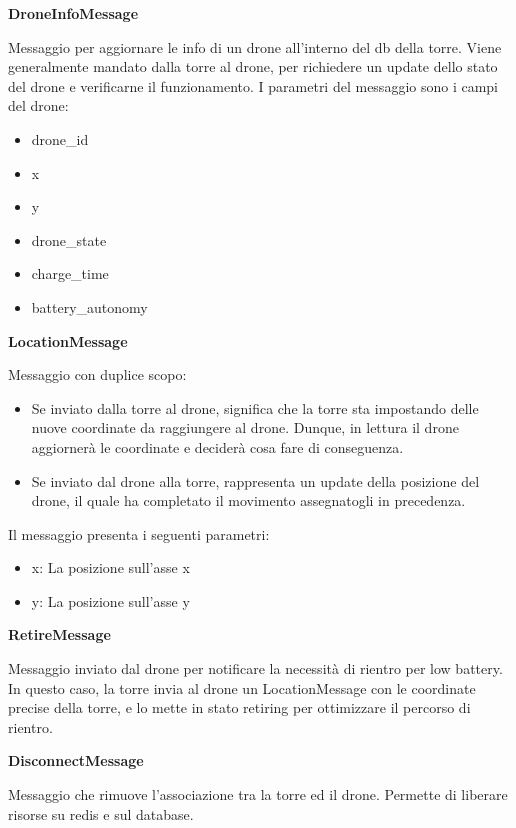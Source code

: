 \documentclass[a4paper, 11pt]{article}
\newenvironment{myindentpar}[1]%
  {\begin{list}{}%
          {\setlength{\leftmargin}{#1}}%
          \item[]%
  }
  {\end{list}}
\begin{document}
\textbf{DroneInfoMessage}
\begin{myindentpar}{0.4cm}
Messaggio per aggiornare le info di un drone all'interno del db della torre. Viene generalmente mandato dalla torre al drone, per richiedere un update dello stato del drone e verificarne il funzionamento.
I parametri del messaggio sono i campi del drone:
\begin{itemize}
    \item drone\_id
    \item x
    \item y
    \item drone\_state
    \item charge\_time
    \item battery\_autonomy
\end{itemize}
\end{myindentpar}

\textbf{LocationMessage}
\begin{myindentpar}{0.4cm}
Messaggio con duplice scopo:
\begin{itemize}
    \item Se inviato dalla torre al drone, significa che la torre sta impostando delle nuove coordinate da raggiungere al drone. Dunque, in lettura il drone aggiornerà le coordinate e deciderà cosa fare di conseguenza.
    \item Se inviato dal drone alla torre, rappresenta un update della posizione del drone, il quale ha completato il movimento assegnatogli in precedenza.
\end{itemize}
Il messaggio presenta i seguenti parametri:
\begin{itemize}
    \item x: La posizione sull'asse x
    \item y: La posizione sull'asse y
\end{itemize}
\end{myindentpar}

\textbf{RetireMessage}
\begin{myindentpar}{0.4cm}
Messaggio inviato dal drone per notificare la necessità di rientro per low battery.
In questo caso, la torre invia al drone un LocationMessage con le coordinate precise della torre, e lo mette in stato retiring per ottimizzare il percorso di rientro.
\end{myindentpar}

\textbf{DisconnectMessage}
\begin{myindentpar}{0.4cm}
Messaggio che rimuove l'associazione tra la torre ed il drone. Permette di liberare risorse su redis e sul database.
\end{myindentpar}
\newpage
\end{document}
